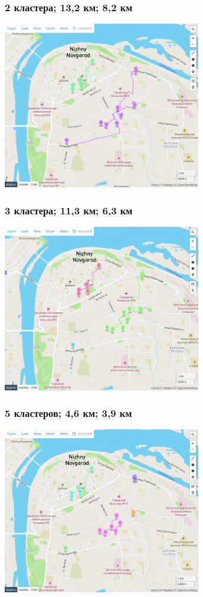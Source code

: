 \documentclass{beamer}
\begin{document}
\begin{frame}
	\frametitle{2 кластера; 13,2 км; 8,2 км}
	\centering
	\includegraphics[width=0.65\textwidth]{k2}
\end{frame}

\begin{frame}
	\frametitle{3 кластера; 11,3 км; 6,3 км}
	\centering
	\includegraphics[width=0.65\textwidth]{k3}
\end{frame}

\begin{frame}
	\frametitle{5 кластеров; 4,6 км; 3,9 км}
	\centering
	\includegraphics[width=0.65\textwidth]{k5}
\end{frame}
\end{document}
